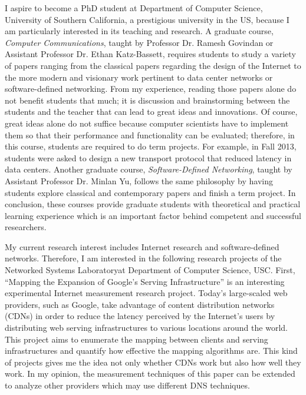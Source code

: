 \documentclass[a4paper,10pt]{report}
\newcommand{\university}{University of Southern California}
\newcommand{\department}{Department of Computer Science}
\newcommand{\uniabbre}{USC}
\newcommand{\labfirst}{Networked Systems Laboratory}
\begin{document}
\vspace{0.2cm}
I aspire to become a PhD student at \department, \university, a prestigious university in the US, because I am particularly interested in its teaching and research. A graduate course, \textit{Computer Communications}, taught by Professor Dr. Ramesh Govindan or Assistant Professor Dr. Ethan Katz-Bassett, requires students to study a variety of papers ranging from the classical papers regarding the design of the Internet to the more modern and visionary work pertinent to data center networks or software-defined networking. From my experience, reading those papers alone do not benefit students that much; it is discussion and brainstorming between the students and the teacher that can lead to great ideas and innovations. Of course, great ideas alone do not suffice because computer scientists have to implement them so that their performance and functionality can be evaluated; therefore, in this course, students are required to do term projects. For example, in Fall 2013, students were asked to design a new transport protocol that reduced latency in data centers. Another graduate course, \textit{Software-Defined Networking}, taught by Assistant Professor Dr. Minlan Yu, follows the same philosophy by having students explore classical and contemporary papers and finish a term project. In conclusion, these courses provide graduate students with theoretical and practical learning experience which is an important factor behind competent and successful researchers.

\vspace{0.2cm}
My current research interest includes Internet research and software-defined networks. Therefore, I am interested in the following research projects of the \labfirst \space at \department, \uniabbre. First, ``Mapping the Expansion of Google's Serving Infrastructure'' is an interesting experimental Internet measurement research project. Today's large-scaled web providers, such as Google, take advantage of content distribution networks (CDNs) in order to reduce the latency perceived by the Internet's users by distributing web serving infrastructures to various locations around the world. This project aims to enumerate the mapping between clients and serving infrastructures and quantify how effective the mapping algorithms are. This kind of projects gives me the idea not only whether CDNs work but also how well they work. In my opinion, the measurement techniques of this paper can be extended to analyze other providers which may use different DNS techniques.
\end{document}
